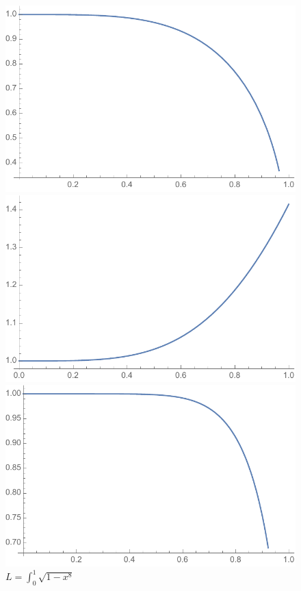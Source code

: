 \documentclass[12pt]{article}
\begin{document}
\begin{figure}[!htb]
  \includegraphics[width=\linewidth]{2J_graph.pdf}
  \caption{$J = \int_{0}^{1}\sqrt{1-x^4}$}
\endminipage\hfill
{}
  \includegraphics[width=\linewidth]{2K_graph.pdf}
  \caption{$K = \int_{0}^{1}\sqrt{1+x^4}$}
\endminipage\hfill
{}%
  \includegraphics[width=\linewidth]{2L_graph.pdf}
  \caption{$L = \int_{0}^{1}\sqrt{1-x^8}$}
\endminipage
\end{figure}
\end{document}
